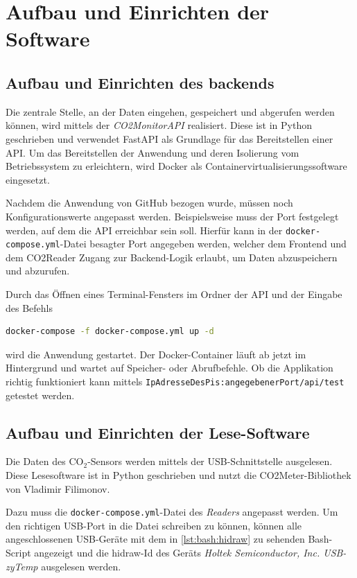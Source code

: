\documentclass[a4paper,
    11pt,
    headings=small,
    ngerman,
    listof=totoc,
    numbers=noenddot]{scrreprt}[2021/11/13]
\begin{document}
\section{Aufbau und Einrichten der Software}

\subsection{Aufbau und Einrichten des \gls{backend}s}

Die zentrale Stelle, an der Daten eingehen, gespeichert und abgerufen werden können, wird mittels der \textit{CO2MonitorAPI} realisiert. Diese ist in Python geschrieben und verwendet FastAPI als Grundlage für das Bereitstellen einer API. Um das Bereitstellen der Anwendung und deren  Isolierung vom Betriebssystem zu erleichtern, wird Docker als Containervirtualisierungssoftware eingesetzt.

Nachdem die Anwendung von GitHub bezogen wurde, müssen noch Konfigurationswerte angepasst werden. Beispielsweise muss der Port festgelegt werden, auf dem die \ac{API} erreichbar sein soll. Hierfür kann in der \texttt{docker-compose.yml}-Datei besagter Port angegeben werden, welcher dem Frontend und dem CO2Reader Zugang zur Backend-Logik erlaubt, um Daten abzuspeichern und abzurufen.

Durch das Öffnen eines Terminal-Fensters im Ordner der \ac{API} und der Eingabe des Befehls

\begin{lstlisting}[language=Bash]
  docker-compose -f docker-compose.yml up -d
\end{lstlisting}

wird die Anwendung gestartet. Der Docker-Container läuft ab jetzt im Hintergrund und wartet auf Speicher- oder Abrufbefehle. Ob die Applikation richtig funktioniert kann mittels \texttt{IpAdresseDesPis:angegebenerPort/api/test} getestet werden.


\subsection{Aufbau und Einrichten der Lese-Software}

Die Daten des CO$_2$-Sensors werden mittels der USB-Schnittstelle ausgelesen. Diese Lesesoftware ist in Python geschrieben und nutzt die CO2Meter-Bibliothek von Vladimir Filimonov.
\autocite{github_co2meter}

Dazu muss die \texttt{docker-compose.yml}-Datei des \textit{Readers} angepasst werden. Um den richtigen USB-Port in die Datei schreiben zu können, können alle angeschlossenen USB-Geräte mit dem in \cref{lst:bash:hidraw} zu sehenden Bash-Script angezeigt und die hidraw-Id des Geräts \textit{Holtek Semiconductor, Inc. USB-zyTemp} ausgelesen werden. \autocite{get_usb_hidraw}
\end{document}
